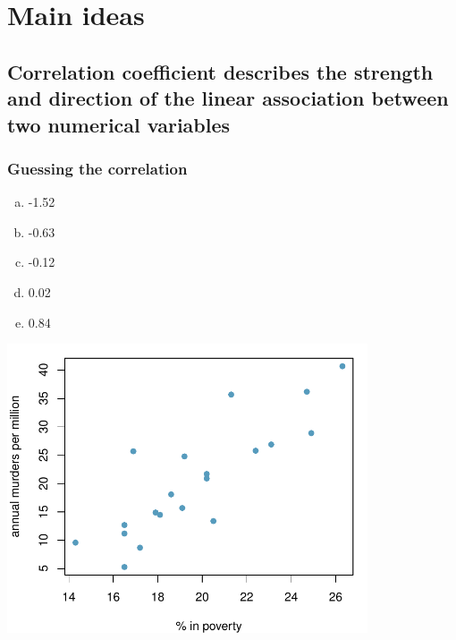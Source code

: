 \documentclass[11pt,containsverbatim,handout,xcolor=xelatex,dvipsnames,table]{beamer}
\newcommand{\solnMult}[1]{#1}
\begin{document}

\section{Main ideas}


\subsection{Correlation coefficient describes the strength and direction of the linear association between two numerical variables}
\label{mi1}


\begin{frame}
\frametitle{Guessing the correlation}


{
\begin{enumerate}[(a)]
\item -1.52
\item -0.63
\item -0.12
\item 0.02
\item \solnMult{0.84}
\end{enumerate}
}
{
\begin{center}
\includegraphics[width=0.8\textwidth]{figures/murder/annual_murders_per_mil_perc_pov}
\end{center}
}

\end{frame}
\end{document}
